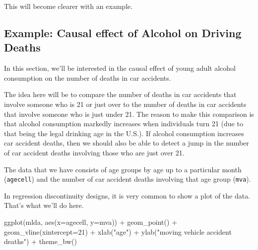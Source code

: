 \documentclass[
  letterpaper,
  DIV=11,
  numbers=noendperiod]{scrreprt}
\newenvironment{Shaded}{\begin{snugshade}}{\end{snugshade}}
\newcommand{\AttributeTok}[1]{\textcolor[rgb]{0.40,0.45,0.13}{#1}}
\newcommand{\CommentTok}[1]{\textcolor[rgb]{0.37,0.37,0.37}{#1}}
\newcommand{\DecValTok}[1]{\textcolor[rgb]{0.68,0.00,0.00}{#1}}
\newcommand{\FunctionTok}[1]{\textcolor[rgb]{0.28,0.35,0.67}{#1}}
\newcommand{\NormalTok}[1]{\textcolor[rgb]{0.00,0.23,0.31}{#1}}
\newcommand{\OtherTok}[1]{\textcolor[rgb]{0.00,0.23,0.31}{#1}}
\newcommand{\SpecialCharTok}[1]{\textcolor[rgb]{0.37,0.37,0.37}{#1}}
\newcommand{\StringTok}[1]{\textcolor[rgb]{0.13,0.47,0.30}{#1}}
\begin{document}
This will become clearer with an example.

\subsection{Example: Causal effect of Alcohol on Driving
Deaths}\label{example-causal-effect-of-alcohol-on-driving-deaths}

In this section, we'll be interested in the causal effect of young adult
alcohol consumption on the number of deaths in car accidents.

The idea here will be to compare the number of deaths in car accidents
that involve someone who is 21 or just over to the number of deaths in
car accidents that involve someone who is just under 21. The reason to
make this comparison is that alcohol consumption markedly increases when
individuals turn 21 (due to that being the legal drinking age in the
U.S.). If alcohol consumption increases car accident deaths, then we
should also be able to detect a jump in the number of car accident
deaths involving those who are just over 21.

The data that we have consists of age groups by age up to a particular
month (\texttt{agecell}) and the number of car accident deaths involving
that age group (\texttt{mva}).

\begin{Shaded}
\end{Shaded}

In regression discontinuity designs, it is very common to show a plot of
the data. That's what we'll do here.

\begin{Shaded}
\begin{Highlighting}[]
\FunctionTok{ggplot}\NormalTok{(mlda, }\FunctionTok{aes}\NormalTok{(}\AttributeTok{x=}\NormalTok{agecell, }\AttributeTok{y=}\NormalTok{mva)) }\SpecialCharTok{+} 
  \FunctionTok{geom\_point}\NormalTok{() }\SpecialCharTok{+} 
  \FunctionTok{geom\_vline}\NormalTok{(}\AttributeTok{xintercept=}\DecValTok{21}\NormalTok{) }\SpecialCharTok{+} 
  \FunctionTok{xlab}\NormalTok{(}\StringTok{"age"}\NormalTok{) }\SpecialCharTok{+} 
  \FunctionTok{ylab}\NormalTok{(}\StringTok{"moving vehicle accident deaths"}\NormalTok{) }\SpecialCharTok{+} 
  \FunctionTok{theme\_bw}\NormalTok{()}
\end{Highlighting}
\end{Shaded}
\end{document}
